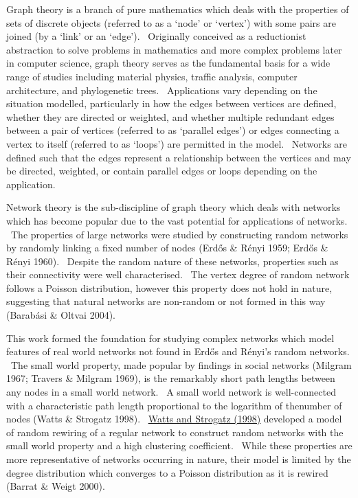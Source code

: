 Graph theory is a branch of pure mathematics which deals with the properties of sets of discrete objects (referred to as a {\textquoteleft}node{\textquoteright} or {\textquoteleft}vertex{\textquoteright}) with some pairs are joined (by a {\textquoteleft}link{\textquoteright} or an {\textquoteleft}edge{\textquoteright}). \ Originally conceived as a reductionist abstraction to solve problems in mathematics and more complex problems later in computer science, graph theory serves as the fundamental basis for a wide range of studies including material physics, traffic analysis, computer architecture, and phylogenetic trees. \ Applications vary depending on the situation modelled, particularly in how the edges between vertices are defined, whether they are directed or weighted, and whether multiple redundant edges between a pair of vertices (referred to as {\textquoteleft}parallel edges{\textquoteright}) or edges connecting a vertex to itself (referred to as {\textquoteleft}loops{\textquoteright}) are permitted in the model. \ Networks are defined such that the edges represent a relationship between the vertices and may be directed, weighted, or contain parallel edges or loops depending on the application. \ 

Network theory is the sub-discipline of graph theory which deals with networks which has become popular due to the vast potential for applications of networks. \ The properties of large networks were studied by constructing random networks by randomly linking a fixed number of nodes (Erd\H{o}s \& R\'enyi 1959; Erd\H{o}s \& R\'enyi 1960). \ Despite the random nature of these networks, properties such as their connectivity were well characterised. \ The vertex degree of random network follows a Poisson distribution, however this property does not hold in nature, suggesting that natural networks are non-random or not formed in this way (Barab\'asi \& Oltvai 2004). \ 


This work formed the foundation for studying complex networks which model features of real world networks not found in Erd\H{o}s and R\'enyi{\textquoteright}s random networks. \ The small world property, made popular by findings in social networks (Milgram 1967; Travers \& Milgram 1969), is the remarkably short path lengths between any nodes in a small world network. \ A small world network is well-connected with a characteristic path length proportional to the logarithm of thenumber of nodes (Watts \& Strogatz 1998). \ \hyperlink{ENREF112}{Watts and Strogatz (1998)} developed a model of random rewiring of a regular network to construct random networks with the small world property and a high clustering coefficient. \ While these properties are more representative of networks occurring in nature, their model is limited by the degree distribution which converges to a Poisson distribution as it is rewired (Barrat \& Weigt 2000). \ 


